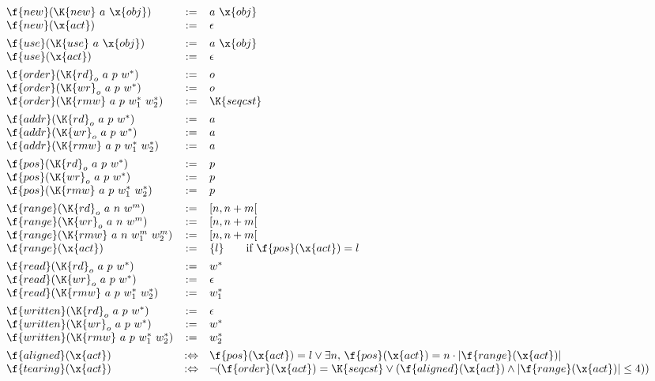 \begin{figure*}
\vspace{1ex}

$$
\begin{array}{lcll}
\f{new}(\K{new}~a~\x{obj}) &:=& a~\x{obj} \\
\f{new}(\x{act}) &:=& \epsilon \\
[1ex]
\f{use}(\K{use}~a~\x{obj}) &:=& a~\x{obj} \\
\f{use}(\x{act}) &:=& \epsilon \\
[1ex]
\f{order}(\K{rd}_o~a~p~w^\ast) &:=& o \\
\f{order}(\K{wr}_o~a~p~w^\ast) &:=& o \\
\f{order}(\K{rmw}~a~p~w_1^\ast~w_2^\ast) &:=& \K{seqcst} \\
[1ex]
\f{addr}(\K{rd}_o~a~p~w^\ast) &:=& a \\
\f{addr}(\K{wr}_o~a~p~w^\ast) &:=& a \\
\f{addr}(\K{rmw}~a~p~w_1^\ast~w_2^\ast) &:=& a \\
[1ex]
\f{pos}(\K{rd}_o~a~p~w^\ast) &:=& p \\
\f{pos}(\K{wr}_o~a~p~w^\ast) &:=& p \\
\f{pos}(\K{rmw}~a~p~w_1^\ast~w_2^\ast) &:=& p \\
[1ex]
\f{range}(\K{rd}_o~a~n~w^m) &:=& [n, n+m[ \\
\f{range}(\K{wr}_o~a~n~w^m) &:=& [n, n+m[ \\
\f{range}(\K{rmw}~a~n~w_1^m~w_2^m) &:=& [n, n+m[ \\
\f{range}(\x{act}) &:=& \{l\} \qquad \mbox{if $\f{pos}(\x{act}) = l$} \\
[1ex]
\f{read}(\K{rd}_o~a~p~w^\ast) &:=& w^\ast \\
\f{read}(\K{wr}_o~a~p~w^\ast) &:=& \epsilon \\
\f{read}(\K{rmw}~a~p~w_1^\ast~w_2^\ast) &:=& w_1^\ast \\
[1ex]
\f{written}(\K{rd}_o~a~p~w^\ast) &:=& \epsilon \\
\f{written}(\K{wr}_o~a~p~w^\ast) &:=& w^\ast \\
\f{written}(\K{rmw}~a~p~w_1^\ast~w_2^\ast) &:=& w_2^\ast \\
[1ex]
\f{aligned}(\x{act}) &:\Leftrightarrow& \f{pos}(\x{act}) = l \vee \exists n,\,\f{pos}(\x{act}) = n \cdot |\f{range}(\x{act})| \\
\f{tearing}(\x{act}) &:\Leftrightarrow& \neg (\f{order}(\x{act}) = \K{seqcst} \vee (\f{aligned}(\x{act}) \wedge |\f{range}(\x{act})| \leq 4)) \\

\end{array}$$
\end{figure*}

